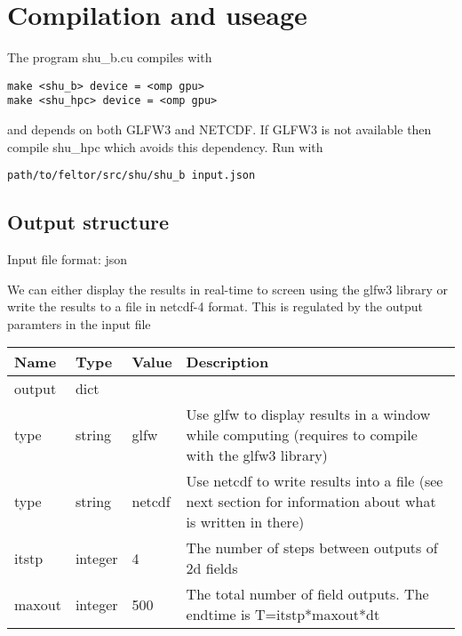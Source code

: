 \section{Compilation and useage}
The program shu\_b.cu compiles with
\begin{verbatim}
make <shu_b> device = <omp gpu>
make <shu_hpc> device = <omp gpu>
\end{verbatim}
and depends on both GLFW3 and NETCDF. If GLFW3 is not available then compile shu\_hpc which avoids this dependency.
Run with
\begin{verbatim}
path/to/feltor/src/shu/shu_b input.json
\end{verbatim}

\subsection{Output structure}
Input file format: json

We can either display the results in real-time to screen using the glfw3 library or
write the results to a file in netcdf-4 format.
This is regulated by the output paramters in the input file
\begin{longtable}{lllp{7cm}}
\toprule
\rowcolor{gray!50}\textbf{Name} &  \textbf{Type} & \textbf{Value}  & \textbf{Description}  \\ \midrule
output & dict & & \\
\qquad type  & string& glfw & Use glfw to display results in a window while computing (requires to compile with the glfw3 library) \\
\qquad type  & string& netcdf & Use netcdf to write results into a file (see next section for information about what is written in there) \\
\qquad itstp  & integer& 4 & The number of steps between outputs of 2d fields \\
\qquad maxout  & integer& 500 & The total number of field outputs. The endtime is T=itstp*maxout*dt \\
\bottomrule
\end{longtable}
